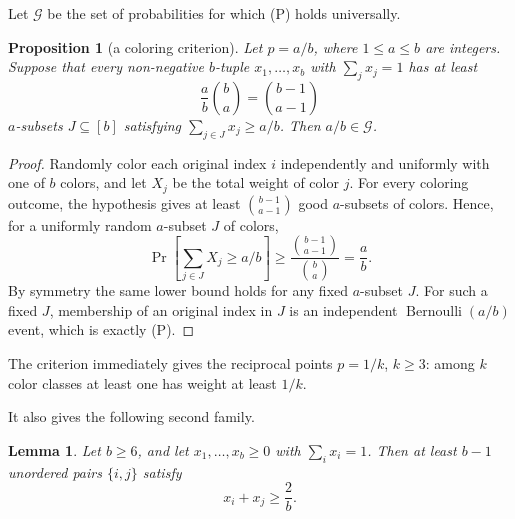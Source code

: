 \documentclass[12pt]{article}
\newtheorem{proposition}{Proposition}
\newtheorem{lemma}{Lemma}
\newcommand{\Ber}{\operatorname{Bernoulli}}
\begin{document}
Let \(\mathcal G\) be the set of probabilities for which (P) holds universally.

\begin{proposition}[a coloring criterion]\label{prop:criterion}
Let \(p=a/b\), where \(1\le a\le b\) are integers.  Suppose that every
non-negative \(b\)-tuple \(x_1,\ldots,x_b\) with \(\sum_j x_j=1\) has at least
\[
        \frac{a}{b}\binom ba=\binom{b-1}{a-1}
\]
\(a\)-subsets \(J\subseteq[b]\) satisfying \(\sum_{j\in J}x_j\ge a/b\).  Then
\(a/b\in\mathcal G\).
\end{proposition}

\begin{proof}
Randomly color each original index \(i\) independently and uniformly with one
of \(b\) colors, and let \(X_j\) be the total weight of color \(j\).  For every
coloring outcome, the hypothesis gives at least \(\binom{b-1}{a-1}\) good
\(a\)-subsets of colors.  Hence, for a uniformly random \(a\)-subset \(J\) of
colors,
\[
       \Pr\!\left[\sum_{j\in J}X_j\ge a/b\right]\ge
       \frac{\binom{b-1}{a-1}}{\binom ba}=\frac ab .
\]
By symmetry the same lower bound holds for any fixed \(a\)-subset \(J\).  For
such a fixed \(J\), membership of an original index in \(J\) is an independent
\(\Ber(a/b)\) event, which is exactly (P).
\end{proof}

The criterion immediately gives the reciprocal points \(p=1/k\), \(k\ge3\):
among \(k\) color classes at least one has weight at least \(1/k\).

It also gives the following second family.

\begin{lemma}\label{lem:pairs}
Let \(b\ge6\), and let \(x_1,\ldots,x_b\ge0\) with \(\sum_i x_i=1\).  Then at
least \(b-1\) unordered pairs \(\{i,j\}\) satisfy
\[
       x_i+x_j\ge \frac2b .
\]
\end{lemma}
\end{document}
